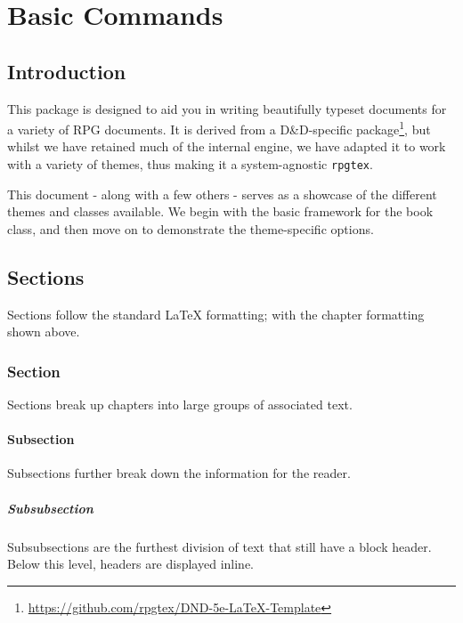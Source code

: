 
\frontmatter
{}

\tableofcontents


\mainmatter

\part[engine_part]{Basic Commands}

	\chapter{Introduction}


	 This package is designed to aid you in writing beautifully typeset documents for a variety of RPG documents. It is derived from {a D\&D-specific package}\footnote{\url{https://github.com/rpgtex/DND-5e-LaTeX-Template}}, but whilst we have retained much of the internal engine, we have adapted it to work with a variety of themes, thus making it a system-agnostic \verb|rpgtex|.

	This document - along with a few others - serves as a showcase of the different themes and classes available. We begin with the basic framework for the book class, and then move on to demonstrate the theme-specific options.

	\chapter{Sections}
		Sections follow the standard \LaTeX{} formatting; with the chapter formatting shown above.
		\section{Section}
			Sections break up chapters into large groups of associated text.

			\subsection{Subsection}
				Subsections further break down the information for the reader.

				\subsubsection{Subsubsection}
					Subsubsections are the furthest division of text that still have a block header. Below this level, headers are displayed inline.

